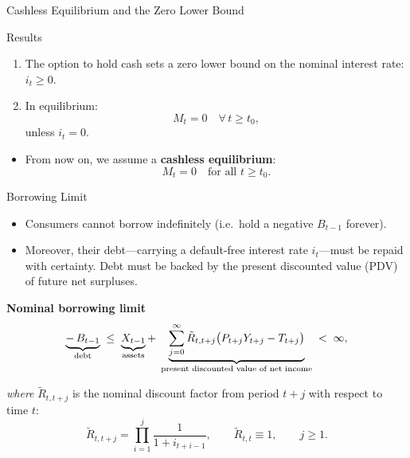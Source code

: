 \documentclass[11pt,aspectratio=169]{beamer}
\begin{document}
\begin{frame}{Cashless Equilibrium and the Zero Lower Bound}
\begin{block}{Results}
\begin{enumerate}
  \item The option to hold cash sets a zero lower bound on the nominal interest rate: $i_t \geq 0$.
  \item In equilibrium:
  \[
  M_t = 0 \quad \forall\, t \ge t_0,
  \]
  unless $i_t = 0$.
\end{enumerate}
\end{block}

\begin{itemize}
  \item From now on, we assume a \textbf{cashless equilibrium}:
  \[
  M_t = 0 \quad \text{for all } t \ge t_0.
  \]
\end{itemize}
\end{frame}


\begin{frame}{Borrowing Limit}


\begin{itemize}
  \item Consumers cannot borrow indefinitely (i.e.\ hold a negative $B_{t-1}$ forever).
  \item Moreover, their debt—carrying a default-free interest rate $i_t$—must be repaid with certainty. Debt must be backed by the present discounted value (PDV) of future net surpluses. 
\end{itemize}
\noindent\textbf{Nominal borrowing limit}
\begin{equation}
\underbrace{-\,B_{t-1}}_{\text{\scriptsize debt}}
\;\le\;
\underbrace{X_{t-1}}_{\text{\scriptsize assets}}
+\;
\underbrace{\sum_{j=0}^{\infty} 
\tilde{R}_{t,t+j}\big(P_{t+j}Y_{t+j}-T_{t+j}\big)}_{\text{\scriptsize present discounted value of net income}}
\;<\;\infty,
\label{eq:nom_borrowing}
\end{equation}

\hspace{0.6cm}\textit{where} $\tilde{R}_{t,t+j}$ is the nominal discount factor from period $t+j$ with respect to time $t$:
\vspace{-0.3cm}
\[
\tilde{R}_{t,t+j}
= \prod_{i=1}^{j} \frac{1}{1 + i_{t+i-1}},
\qquad 
\tilde{R}_{t,t} \equiv 1,
\qquad 
j \ge 1.
\label{eq:nom_discount_fac}
\]
\end{frame}
\end{document}
